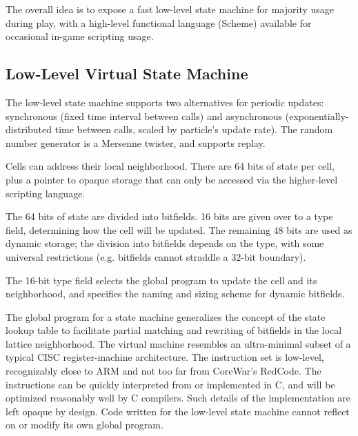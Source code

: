 \documentclass{acm_proc_article-sp}
\begin{document}
The overall idea is to expose a fast low-level state machine for majority usage during play,
with a high-level functional language (Scheme) available for occasional in-game scripting usage.

\subsection{Low-Level Virtual State Machine}

The low-level state machine supports two alternatives for periodic updates:
synchronous (fixed time interval between calls)
and asynchronous (exponentially-distributed time between calls, scaled by particle's update rate).
The random number generator is a Mersenne twister, and supports replay.

Cells can address their local neighborhood.
There are 64 bits of state per cell,
plus a pointer to opaque storage that can only be accessed via the higher-level scripting language.

The 64 bits of state are divided into bitfields.
16 bits are given over to a type field, determining how the cell will be updated.
The remaining 48 bits are used as dynamic storage; the division into bitfields depends on the type,
with some universal restrictions (e.g. bitfields cannot straddle a 32-bit boundary).

The 16-bit type field selects the global program to update the cell and its neighborhood,
and specifies the naming and sizing scheme for dynamic bitfields.

The global program for a state machine generalizes the concept of the state lookup table to facilitate partial matching and rewriting of bitfields in the local lattice neighborhood.
The virtual machine resembles an ultra-minimal subset of a typical CISC register-machine architecture.
The instruction set is low-level, recognizably close to ARM\cite{seal00} and not too far from CoreWar's RedCode\cite{CoreWarGuidelines84}.
The instructions can be quickly interpreted from or implemented in C, and will be optimized reasonably well by C compilers.
Such details of the implementation are left opaque by design.
Code written for the low-level state machine cannot reflect on or modify its own global program.
\end{document}

